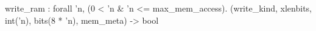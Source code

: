 write_ram : forall 'n, (0 < 'n & 'n <= max_mem_access). (write_kind, xlenbits, int('n), bits(8 * 'n), mem_meta) -> bool